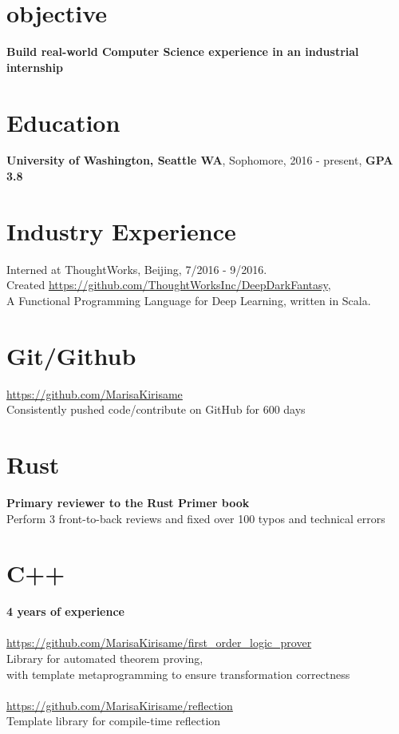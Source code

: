 \documentclass[margin,line]{res}
\begin{document}

\begin{resume}



\section{\sc objective}
\textbf{Build real-world Computer Science experience in an industrial internship}

\section{\sc Education}
\textbf{University of Washington, Seattle WA}, Sophomore, 2016 - present, 
\textbf{GPA 3.8}

\section{Industry Experience} Interned at ThoughtWorks, Beijing, 7/2016 - 9/2016. \\ Created \url{https://github.com/ThoughtWorksInc/DeepDarkFantasy}, \\
A Functional Programming Language for Deep Learning, written in Scala. 

\section{\sc Git/Github}
\url{https://github.com/MarisaKirisame} \\
Consistently pushed code/contribute on GitHub for 600 days

\section{\sc Rust}
\textbf{Primary reviewer to the Rust Primer book} \\
Perform 3 front-to-back reviews and fixed over 100 typos and technical errors

\section{\sc C++} 
\textbf{4 years of experience} \\
\\
\url{https://github.com/MarisaKirisame/first_order_logic_prover} \\
Library for automated theorem proving, \\
with template metaprogramming to ensure transformation correctness \\
\\
\url{https://github.com/MarisaKirisame/reflection} \\
Template library for compile-time reflection


\end{resume}
\end{document}
